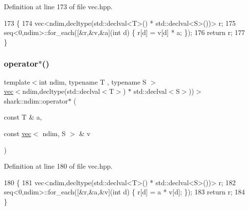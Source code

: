 Definition at line 173 of file vec.\+hpp.


\begin{DoxyCode}
173                                                                                                            
            \{
174             vec<ndim,decltype(std::declval<T>() * std::declval<S>())> r;
175             seq<0,ndim>::for\_each([&r,&v,&a](\textcolor{keywordtype}{int} d) \{ r[d] = v[d] * a; \});
176             \textcolor{keywordflow}{return} r;
177         \}
\end{DoxyCode}
\hypertarget{namespaceshark_1_1ndim_aca5a0b87c3d83950719f7ec19025b3b5}{}\label{namespaceshark_1_1ndim_aca5a0b87c3d83950719f7ec19025b3b5} 
\subsubsection{\texorpdfstring{operator$\ast$()}{operator*()}\hspace{0.1cm}{\footnotesize\ttfamily [3/6]}}
{\footnotesize\ttfamily template$<$int ndim, typename T , typename S $>$ \\
\hyperlink{structshark_1_1ndim_1_1vec}{vec}$<$ndim,decltype(std\+::declval$<$T$>$) $\ast$ std\+::declval$<$S$>$))$>$ shark\+::ndim\+::operator$\ast$ (\begin{DoxyParamCaption}\item[{const T \&}]{a,  }\item[{const \hyperlink{structshark_1_1ndim_1_1vec}{vec}$<$ ndim, S $>$ \&}]{v }\end{DoxyParamCaption})\hspace{0.3cm}{\ttfamily [inline]}}



Definition at line 180 of file vec.\+hpp.


\begin{DoxyCode}
180                                                                                                            
            \{
181             vec<ndim,decltype(std::declval<T>() * std::declval<S>())> r;
182             seq<0,ndim>::for\_each([&r,&a,&v](\textcolor{keywordtype}{int} d) \{ r[d] = a * v[d]; \});
183             \textcolor{keywordflow}{return} r;
184         \}
\end{DoxyCode}
\hypertarget{namespaceshark_1_1ndim_a41663f041f9fc6fee5b026e8d046cc52}{}\label{namespaceshark_1_1ndim_a41663f041f9fc6fee5b026e8d046cc52} 
